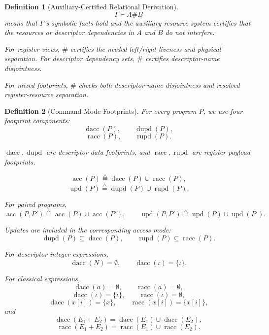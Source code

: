 \documentclass[acmsmall,screen,review,anonymous,nonacm]{acmart}
\newtheorem{definition}{Definition}[section]
\theoremstyle{defn_style}
\begin{document}
    \begin{definition}[Auxiliary-Certified Relational Derivation]
      \[
      \Gamma\vdash A\#B
      \]
      means that \(\Gamma\)'s symbolic facts hold and the auxiliary resource system
      certifies that the resources or descriptor dependencies in \(A\) and \(B\) do
      not interfere.
      
      For register views, \(\#\) certifies the needed left/right liveness and
      physical separation. For descriptor dependency sets, \(\#\) certifies
      descriptor-name disjointness.

      For mixed footprints, \(\#\) checks both descriptor-name disjointness and
resolved register-resource separation.
      \end{definition}

\begin{definition}[Command-Mode Footprints]
For every program \(P\), we use four footprint components:
\[
\operatorname{dacc}(P),
\qquad
\operatorname{dupd}(P),
\]
\[
\operatorname{racc}(P),
\qquad
\operatorname{rupd}(P).
\]

\(\operatorname{dacc},\operatorname{dupd}\) are descriptor-data footprints, and
\(\operatorname{racc},\operatorname{rupd}\) are register-payload footprints.

\[
\operatorname{acc}(P)
\stackrel{\triangle}{=}
\operatorname{dacc}(P)
\cup
\operatorname{racc}(P),
\]
\[
\operatorname{upd}(P)
\stackrel{\triangle}{=}
\operatorname{dupd}(P)
\cup
\operatorname{rupd}(P).
\]

For paired programs,
\[
\operatorname{acc}(P,P')
\stackrel{\triangle}{=}
\operatorname{acc}(P)\cup\operatorname{acc}(P'),
\qquad
\operatorname{upd}(P,P')
\stackrel{\triangle}{=}
\operatorname{upd}(P)\cup\operatorname{upd}(P').
\]

Updates are included in the corresponding access mode:
\[
\operatorname{dupd}(P)\subseteq \operatorname{dacc}(P),
\qquad
\operatorname{rupd}(P)\subseteq \operatorname{racc}(P).
\]

For descriptor integer expressions,
\[
\operatorname{dacc}(N)=\emptyset,
\qquad
\operatorname{dacc}(\iota)=\{\iota\}.
\]


For classical expressions,
\[
\operatorname{dacc}(a)=\emptyset,
\qquad
\operatorname{racc}(a)=\emptyset,
\]
\[
\operatorname{dacc}(\iota)=\{\iota\},
\qquad
\operatorname{racc}(\iota)=\emptyset,
\]
\[
\operatorname{dacc}(x[i])=\{x\},
\qquad
\operatorname{racc}(x[i])=\{x[i]\},
\]
and
\[
\operatorname{dacc}(E_1+E_2)
=
\operatorname{dacc}(E_1)\cup\operatorname{dacc}(E_2),
\]
\[
\operatorname{racc}(E_1+E_2)
=
\operatorname{racc}(E_1)\cup\operatorname{racc}(E_2).
\]


\end{definition}
\end{document}
